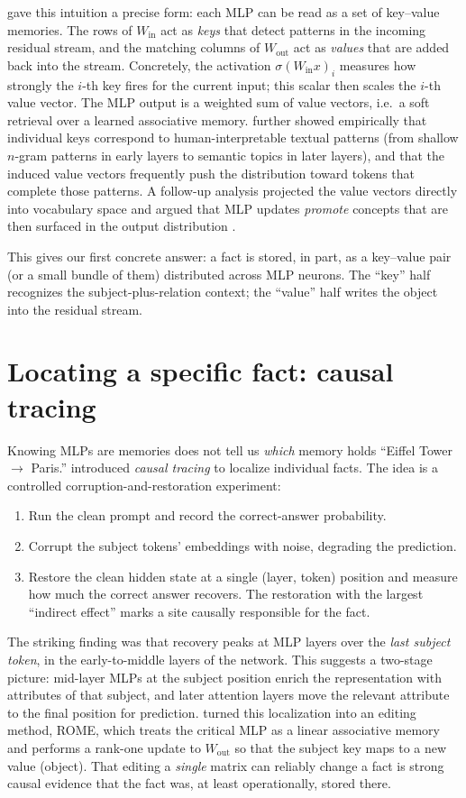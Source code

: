 \documentclass[11pt]{article}
\begin{document}
\citet{geva2021kv} gave this intuition a precise form: each MLP can be read as a set of key--value memories. The rows of $W_{\text{in}}$ act as \emph{keys} that detect patterns in the incoming residual stream, and the matching columns of $W_{\text{out}}$ act as \emph{values} that are added back into the stream. Concretely, the activation $\sigma(W_{\text{in}}x)_i$ measures how strongly the $i$-th key fires for the current input; this scalar then scales the $i$-th value vector. The MLP output is a weighted sum of value vectors, i.e.\ a soft retrieval over a learned associative memory. \citet{geva2021kv} further showed empirically that individual keys correspond to human-interpretable textual patterns (from shallow $n$-gram patterns in early layers to semantic topics in later layers), and that the induced value vectors frequently push the distribution toward tokens that complete those patterns. A follow-up analysis projected the value vectors directly into vocabulary space and argued that MLP updates \emph{promote} concepts that are then surfaced in the output distribution \citep{geva2022promote}.

This gives our first concrete answer: a fact is stored, in part, as a key--value pair (or a small bundle of them) distributed across MLP neurons. The ``key'' half recognizes the subject-plus-relation context; the ``value'' half writes the object into the residual stream.

\section{Locating a specific fact: causal tracing}
Knowing MLPs are memories does not tell us \emph{which} memory holds ``Eiffel Tower $\to$ Paris.'' \citet{meng2022rome} introduced \emph{causal tracing} to localize individual facts. The idea is a controlled corruption-and-restoration experiment:
\begin{enumerate}[leftmargin=*]
  \item Run the clean prompt and record the correct-answer probability.
  \item Corrupt the subject tokens' embeddings with noise, degrading the prediction.
  \item Restore the clean hidden state at a single (layer, token) position and measure how much the correct answer recovers. The restoration with the largest ``indirect effect'' marks a site causally responsible for the fact.
\end{enumerate}
The striking finding was that recovery peaks at MLP layers over the \emph{last subject token}, in the early-to-middle layers of the network. This suggests a two-stage picture: mid-layer MLPs at the subject position enrich the representation with attributes of that subject, and later attention layers move the relevant attribute to the final position for prediction. \citet{meng2022rome} turned this localization into an editing method, ROME, which treats the critical MLP as a linear associative memory and performs a rank-one update to $W_{\text{out}}$ so that the subject key maps to a new value (object). That editing a \emph{single} matrix can reliably change a fact is strong causal evidence that the fact was, at least operationally, stored there.
\end{document}
